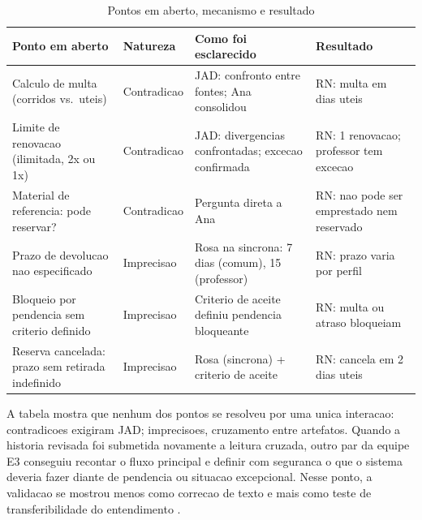\documentclass[12pt]{article}
\begin{document}
\begin{table}[ht]
\centering
\caption{Pontos em aberto, mecanismo e resultado}
\label{tab:levantamento}
\scriptsize
\setlength{\tabcolsep}{2.5pt}
\renewcommand{\arraystretch}{0.92}
\begin{tabular}{p{2.45cm}p{1.55cm}p{4.05cm}p{4.0cm}}
\hline
\textbf{Ponto em aberto} & \textbf{Natureza} & \textbf{Como foi esclarecido} & \textbf{Resultado} \\
\hline
Calculo de multa (corridos vs.\ uteis) &
  Contradicao &
  JAD: confronto entre fontes; Ana consolidou &
  RN: multa em dias uteis \\
\hline
Limite de renovacao (ilimitada, 2x ou 1x) &
  Contradicao &
  JAD: divergencias confrontadas; excecao confirmada &
  RN: 1 renovacao; professor tem excecao \\
\hline
Material de referencia: pode reservar? &
  Contradicao &
  Pergunta direta a Ana &
  RN: nao pode ser emprestado nem reservado \\
\hline
Prazo de devolucao nao especificado &
  Imprecisao &
  Rosa na sincrona: 7 dias (comum), 15 (professor) &
  RN: prazo varia por perfil \\
\hline
Bloqueio por pendencia sem criterio definido &
  Imprecisao &
  Criterio de aceite definiu pendencia bloqueante &
  RN: multa ou atraso bloqueiam \\
\hline
Reserva cancelada: prazo sem retirada indefinido &
  Imprecisao &
  Rosa (sincrona) + criterio de aceite &
  RN: cancela em 2 dias uteis \\
\hline
\end{tabular}
\end{table}

A tabela mostra que nenhum dos pontos se resolveu por uma unica interacao: contradicoes exigiram JAD; imprecisoes, cruzamento entre artefatos. Quando a historia revisada foi submetida novamente a leitura cruzada, outro par da equipe E3 conseguiu recontar o fluxo principal e definir com seguranca o que o sistema deveria fazer diante de pendencia ou situacao excepcional. Nesse ponto, a validacao se mostrou menos como correcao de texto e mais como teste de transferibilidade do entendimento \cite{sakthivel1991verification,lucassen2016qus}.
\end{document}
